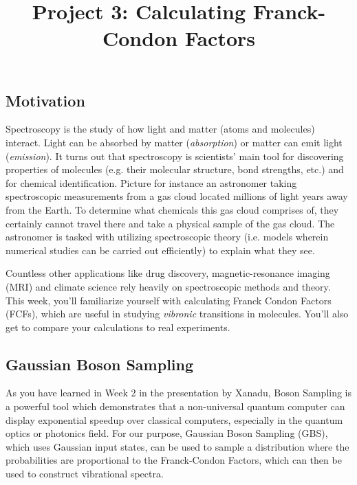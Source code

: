 \documentclass[12pt]{article}
\title{Project 3: Calculating Franck-Condon Factors}
\begin{document}
\maketitle

\thispagestyle{empty}

\subsection*{Motivation}

Spectroscopy is the study of how light and matter (atoms and molecules) interact.
Light can be absorbed by matter (\textit{absorption}) or matter can emit light (\textit{emission}).
It turns out that spectroscopy is scientists' main tool for discovering properties of molecules (e.g. their molecular structure, bond strengths, etc.) and for chemical identification. Picture for instance an astronomer taking spectroscopic measurements from a gas cloud located millions of light years away from the Earth. To determine what chemicals this gas cloud comprises of, they certainly cannot travel there and take a physical sample of the gas cloud. The astronomer is tasked with utilizing spectroscopic theory (i.e. models wherein numerical studies can be carried out efficiently) to explain what they see.

Countless other applications like drug discovery, magnetic-resonance imaging (MRI) and climate science rely heavily on spectroscopic methods and theory. This week, you'll familiarize yourself with calculating Franck Condon Factors (FCFs), which are useful in studying {\it vibronic} transitions in molecules. You'll also get to compare your calculations to real experiments.

\subsection*{Gaussian Boson Sampling}
As you have learned in Week 2 in the presentation by Xanadu, Boson Sampling is a powerful tool which demonstrates that a non-universal quantum computer can display exponential speedup over classical computers, especially in the quantum optics or photonics field\cite{huh2015boson,aaronson2011computational, harrow2017quantum, quesadaFranckCondonFactorsCounting2019}. For our purpose, Gaussian Boson Sampling (GBS), which uses Gaussian input states, can be used to sample a distribution where the probabilities are proportional to the Franck-Condon Factors, which can then be used to construct vibrational spectra.
\end{document}
